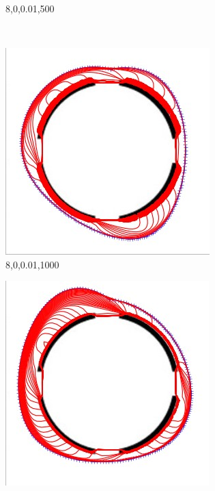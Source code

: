 \documentclass[paper=a4, fontsize=11pt]{scrartcl} %
\numberwithin{equation}{section} %
\numberwithin{figure}{section} %
\numberwithin{table}{section} %
\begin{document}
\begin{figure}[H]
\begin{subfigure}[b]{0.2\textwidth}
                \caption{8,0,0.01,500}
                \label{fig:Gestaltcircle1}
        \end{subfigure}
        ~ %
        \begin{subfigure}[b]{0.2\textwidth}
                \includegraphics[width=\textwidth]{303}
                \caption{8,0,0.01,1000}
                \label{fig:Gestaltcircle2}
        \end{subfigure}
         \begin{subfigure}[b]{0.2\textwidth}
                \includegraphics[width=\textwidth]{304}

\end{subfigure}
\end{figure}
\end{document}
